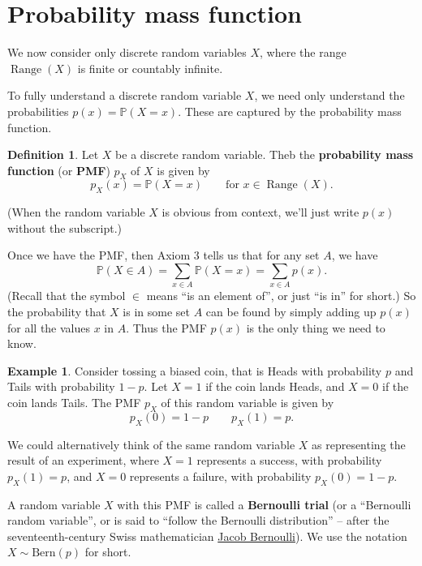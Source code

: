 \documentclass[
  a4paper,
]{book}
\theoremstyle{definition}
\newtheorem{definition}{Definition}[chapter]
\theoremstyle{definition}
\newtheorem{example}{Example}[chapter]
\theoremstyle{definition}
\theoremstyle{definition}
\theoremstyle{remark}
\begin{document}
\hypertarget{pmf}{%
\section{Probability mass function}\label{pmf}}

We now consider only discrete random variables \(X\), where the range \(\operatorname{Range}(X)\) is finite or countably infinite.

To fully understand a discrete random variable \(X\), we need only understand the probabilities \(p(x) = \mathbb P(X = x)\). These are captured by the probability mass function.

\begin{definition}
Let \(X\) be a discrete random variable. Theb the \textbf{probability mass function} (or \textbf{PMF}) \(p_X\) of \(X\) is given by
\[ p_X(x) = \mathbb P(X = x)  \qquad \text{for $x \in \operatorname{Range}(X)$.} \]

(When the random variable \(X\) is obvious from context, we'll just write \(p(x)\) without the subscript.)
\end{definition}

Once we have the PMF, then Axiom 3 tells us that for any set \(A\), we have
\[ \mathbb P(X \in A) = \sum_{x \in A} \mathbb P(X = x) = \sum_{x \in A} p(x) . \]
(Recall that the symbol \(\in\) means ``is an element of'', or just ``is in'' for short.) So the probability that \(X\) is in some set \(A\) can be found by simply adding up \(p(x)\) for all the values \(x\) in \(A\). Thus the PMF \(p(x)\) is the only thing we need to know.

\begin{example}
Consider tossing a biased coin, that is Heads with probability \(p\) and Tails with probability \(1-p\). Let \(X = 1\) if the coin lands Heads, and \(X = 0\) if the coin lands Tails. The PMF \(p_X\) of this random variable is given by
\[ p_X(0) = 1 - p \qquad p_X(1) = p . \]

We could alternatively think of the same random variable \(X\) as representing the result of an experiment, where \(X = 1\) represents a success, with probability \(p_X(1) = p\), and \(X = 0\) represents a failure, with probability \(p_X(0) = 1 - p\).

A random variable \(X\) with this PMF is called a \textbf{Bernoulli trial} (or a ``Bernoulli random variable'', or is said to ``follow the Bernoulli distribution'' -- after the seventeenth-century Swiss mathematician \href{https://mathshistory.st-andrews.ac.uk/Biographies/Bernoulli_Jacob/}{Jacob Bernoulli}). We use the notation \(X \sim \text{Bern}(p)\) for short.
\end{example}
\end{document}

